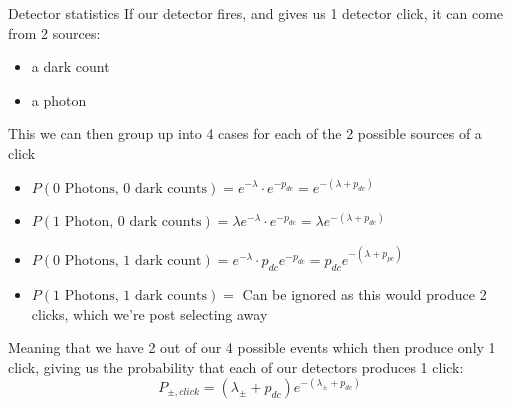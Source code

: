 \documentclass[aspectratio=169]{beamer}
\begin{document}
\begin{frame}{Detector statistics}
    If our detector fires, and gives us 1 detector click, it can come from 2 sources:
    \begin{itemize}
        \item a dark count
        \item a photon
    \end{itemize}
    This we can then group up into 4 cases for each of the 2 possible sources of a click
    \begin{itemize}
        \item $P(\text{0 Photons, 0 dark counts}) = e^{-\lambda}\cdot e^{-p_{dc}} = e^{-(\lambda+p_{dc})}$
        \item $P(\text{1 Photon, 0 dark counts}) = \lambda e^{-\lambda}\cdot e^{-p_{dc}} = \lambda e^{-(\lambda+p_{dc})}$
        \item $P(\text{0 Photons, 1 dark count}) = e^{-\lambda}\cdot p_{dc}e^{-p_{dc}} = p_{dc}e^{-(\lambda+p_{pc})}$
        \item $P(\text{1 Photons, 1 dark counts}) =$ Can be ignored as this would produce 2 clicks, which we're post selecting away 
    \end{itemize}

    Meaning that we have 2 out of our 4 possible events which then produce only 1 click, giving us the probability that each of our detectors produces 1 click:
    \begin{equation}
        P_{\pm, click} = (\lambda_\pm + p_{dc})e^{-(\lambda_\pm+p_{dc})}
        \label{eq:prob_click}
    \end{equation}
\end{frame}
\end{document}
